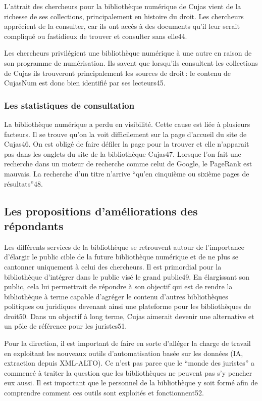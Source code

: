 L’attrait des chercheurs pour la bibliothèque numérique de Cujas vient de la richesse de ses collections, principalement en histoire du droit. Les chercheurs apprécient de la consulter, car ils ont accès à des documents qu’il leur serait compliqué ou fastidieux de trouver et consulter sans elle44. 

Les chercheurs privilégient une bibliothèque numérique à une autre en raison de son programme de numérisation. Ils savent que lorsqu’ils consultent les collections de Cujas ils trouveront principalement les sources de droit : le contenu de CujasNum est donc bien identifié par ses lecteurs45.  

\subsubsection{Les statistiques de consultation}

La bibliothèque numérique a perdu en visibilité. Cette cause est liée à plusieurs facteurs. Il se trouve qu’on la voit difficilement sur la page d’accueil du site de Cujas46. On est obligé de faire défiler la page pour la trouver et elle n’apparait pas dans les onglets du site de la bibliothèque Cujas47. Lorsque l’on fait une recherche dans un moteur de recherche comme celui de Google, le PageRank est mauvais. La recherche d’un titre n’arrive \enquote{qu’en cinquième ou sixième pages de résultats}48.  

\subsection{Les propositions d’améliorations des répondants}

Les différents services de la bibliothèque se retrouvent autour de l’importance d’élargir le public cible de la future bibliothèque numérique et de ne plus se cantonner uniquement à celui des chercheurs. Il est primordial pour la bibliothèque d’intégrer dans le public visé le grand public49. En élargissant son public, cela lui permettrait de répondre à son objectif qui est de rendre la bibliothèque à terme capable d’agréger le contenu d’autres bibliothèques politiques ou juridiques devenant ainsi une plateforme pour les bibliothèques de droit50. Dans un objectif à long terme, Cujas aimerait devenir une alternative et un pôle de référence pour les juristes51.  

Pour la direction, il est important de faire en sorte d’alléger la charge de travail en exploitant les nouveaux outils d’automatisation basée sur les données (IA, extraction depuis XML-ALTO). Ce n’est pas parce que le \enquote{monde des juristes} a commencé à traiter la question que les bibliothèques ne peuvent pas s’y pencher eux aussi. Il est important que le personnel de la bibliothèque y soit formé afin de comprendre comment ces outils sont exploités et fonctionnent52. 



